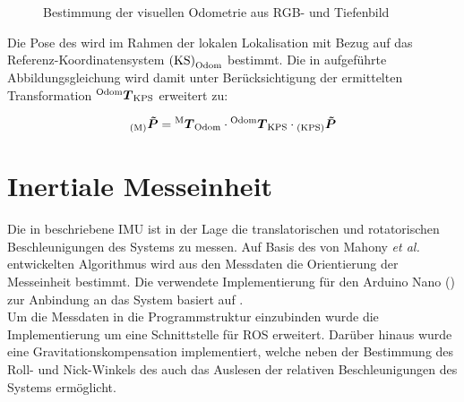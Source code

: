 \begin{figure}[!ht]
	\begin{center}
	\hspace{5mm}
	\caption{Bestimmung der visuellen Odometrie aus RGB- und Tiefenbild}
	\label{fig.fovis}
	\end{center}
\end{figure}

Die Pose des  wird im Rahmen der lokalen Lokalisation mit Bezug auf das Referenz-Koordinatensystem ${\mathrm{(KS)}}_{\mathrm{Odom}}$ bestimmt. Die in  aufgeführte Abbildungsgleichung wird damit unter Berücksichtigung der ermittelten Transformation ${^{\mathrm{Odom}}\mbox{\boldmath{$T$}}_{\mathrm{KPS}}}$ erweitert zu:

\begin{equation}
{_{{\mathrm{(M)}}}}\mbox{\boldmath{$\tilde{P}$}} = {^{\mathrm{M}}\mbox{\boldmath{$T$}}_{\mathrm{Odom}}} \cdot {^{\mathrm{Odom}}\mbox{\boldmath{$T$}}_{\mathrm{KPS}}} \cdot {_{{\mathrm{(KPS)}}}}\mbox{\boldmath{$\tilde{P}$}}
\label{eq.locloc}
\end{equation}

\prever{
}
\prever{
}
\section{Inertiale Messeinheit}
Die in  beschriebene IMU ist in der Lage die translatorischen und rotatorischen Beschleunigungen des Systems zu messen. Auf Basis des von Mahony \textit{et al.} \cite{Mahony2008} entwickelten Algorithmus wird aus den Messdaten die Orientierung der Messeinheit bestimmt. Die verwendete Implementierung für den Arduino Nano () zur Anbindung an das System basiert auf \cite{IMUCode}.\\
Um die Messdaten in die Programmstruktur einzubinden wurde die Implementierung um eine Schnittstelle für ROS erweitert. Darüber hinaus wurde eine Gravitationskompensation implementiert, welche neben der Bestimmung des Roll- und Nick-Winkels des  auch das Auslesen der relativen Beschleunigungen des Systems ermöglicht.\\

